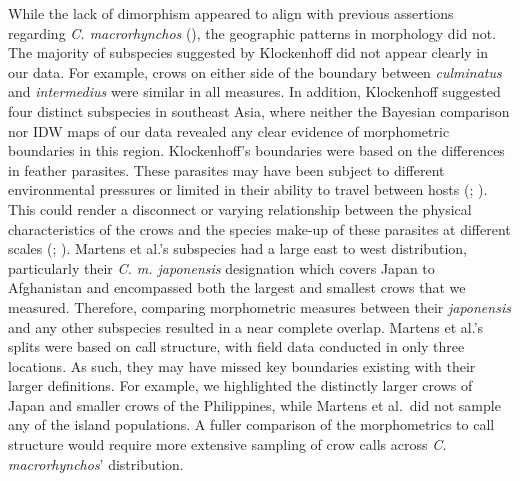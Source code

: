 \documentclass[10pt,a4paper]{article}
\begin{document}
While the lack of dimorphism appeared to align with previous assertions regarding \emph{C. macrorhynchos} (), the geographic patterns in morphology did not.
The majority of subspecies suggested by Klockenhoff did not appear clearly in our data.
For example, crows on either side of the boundary between \emph{culminatus} and \emph{intermedius} were similar in all measures.
In addition, Klockenhoff suggested four distinct subspecies in southeast Asia, where neither the Bayesian comparison nor IDW maps of our data revealed any clear evidence of morphometric boundaries in this region.
Klockenhoff's boundaries were based on the differences in feather parasites.
These parasites may have been subject to different environmental pressures or limited in their ability to travel between hosts (; ).
This could render a disconnect or varying relationship between the physical characteristics of the crows and the species make-up of these parasites at different scales (; ).
Martens et al.'s subspecies had a large east to west distribution, particularly their \emph{C. m. japonensis} designation which covers Japan to Afghanistan and encompassed both the largest and smallest crows that we measured.
Therefore, comparing morphometric measures between their \emph{japonensis} and any other subspecies resulted in a near complete overlap.
Martens et al.'s splits were based on call structure, with field data conducted in only three locations.
As such, they may have missed key boundaries existing with their larger definitions.
For example, we highlighted the distinctly larger crows of Japan and smaller crows of the Philippines, while Martens et al.~did not sample any of the island populations.
A fuller comparison of the morphometrics to call structure would require more extensive sampling of crow calls across \emph{C. macrorhynchos}' distribution.
\end{document}
